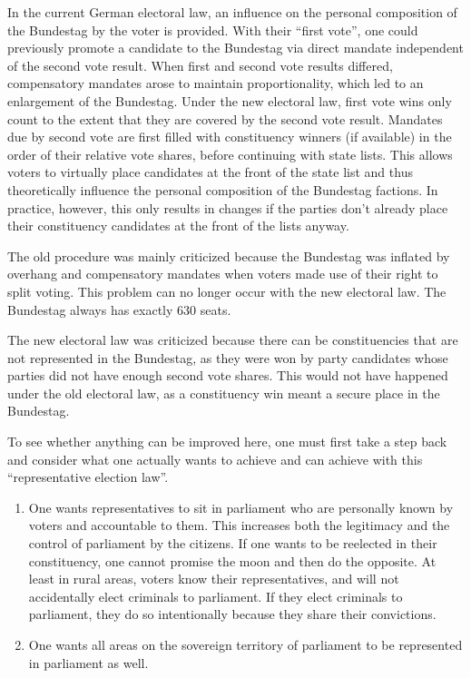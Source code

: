 In the current German electoral law, an influence on the personal composition of the
Bundestag by the voter is provided. With their \enquote{first vote}, one could previously promote a
candidate to the Bundestag via direct mandate independent of the second vote result. When
first and second vote results differed, compensatory mandates arose to maintain
proportionality, which led to an enlargement of the Bundestag. Under the new electoral law,
first vote wins only count to the extent that they are covered by the second vote result. Mandates
due by second vote are first filled with constituency winners (if available) in the order
of their relative vote shares, before continuing with state lists. This allows
voters to virtually place candidates at the front of the state list and thus theoretically influence the personal
composition of the Bundestag factions. In practice, however, this only results in
changes if the parties don't already place their constituency candidates at the front of the lists anyway.

The old procedure was mainly criticized because the Bundestag was inflated by overhang and
compensatory mandates when voters made use of their right to split voting.
This problem can no longer occur with the new electoral law. The
Bundestag always has exactly 630 seats.

The new electoral law was criticized because there can be constituencies that are not represented in the Bundestag,
as they were won by party candidates whose parties did not have enough
second vote shares. This would not have happened under the old electoral law, as a
constituency win meant a secure place in the Bundestag.

To see whether anything can be improved here, one must first take a step
back and consider what one actually wants to achieve and can achieve with this \enquote{representative election law}.

\begin{enumerate}
  \item One wants representatives to sit in parliament who are personally known
    by voters and accountable to them. This increases both the legitimacy and the
    control of parliament by the citizens. If one wants to be
    reelected in their constituency, one cannot promise the moon and then
    do the opposite. At least in rural areas, voters know their representatives,
    and will not accidentally elect criminals to parliament. If they elect criminals to
    parliament, they do so intentionally because they share their convictions.

  \item One wants all areas on the sovereign territory of parliament to be represented
    in parliament as well.
\end{enumerate}

